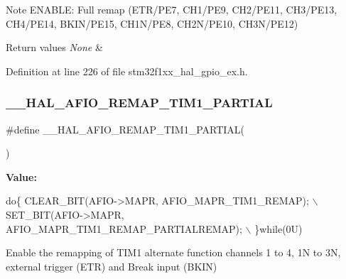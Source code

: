 \begin{DoxyNote}{Note}
E\+N\+A\+B\+LE\+: Full remap (E\+T\+R/\+P\+E7, C\+H1/\+P\+E9, C\+H2/\+P\+E11, C\+H3/\+P\+E13, C\+H4/\+P\+E14, B\+K\+I\+N/\+P\+E15, C\+H1\+N/\+P\+E8, C\+H2\+N/\+P\+E10, C\+H3\+N/\+P\+E12) 
\end{DoxyNote}

\begin{DoxyRetVals}{Return values}
{\em None} & \\
\hline
\end{DoxyRetVals}


Definition at line 226 of file stm32f1xx\+\_\+hal\+\_\+gpio\+\_\+ex.\+h.

\mbox{\label{group___g_p_i_o_ex___a_f_i_o___a_f___r_e_m_a_p_p_i_n_g_ga4e4fec9496a03c10c94f0f4e8d940b08}} 
\subsubsection{\texorpdfstring{\+\_\+\+\_\+\+H\+A\+L\+\_\+\+A\+F\+I\+O\+\_\+\+R\+E\+M\+A\+P\+\_\+\+T\+I\+M1\+\_\+\+P\+A\+R\+T\+I\+AL}{\_\_HAL\_AFIO\_REMAP\_TIM1\_PARTIAL}}
{\footnotesize\ttfamily \#define \+\_\+\+\_\+\+H\+A\+L\+\_\+\+A\+F\+I\+O\+\_\+\+R\+E\+M\+A\+P\+\_\+\+T\+I\+M1\+\_\+\+P\+A\+R\+T\+I\+AL(\begin{DoxyParamCaption}{ }\end{DoxyParamCaption})}

{\bfseries Value\+:}
\begin{DoxyCode}
\textcolor{keywordflow}{do}\{ CLEAR\_BIT(AFIO->MAPR, AFIO\_MAPR\_TIM1\_REMAP);            \(\backslash\)
                                             SET\_BIT(AFIO->MAPR, AFIO\_MAPR\_TIM1\_REMAP\_PARTIALREMAP); \(\backslash\)
                                           \}\textcolor{keywordflow}{while}(0U)
\end{DoxyCode}


Enable the remapping of T\+I\+M1 alternate function channels 1 to 4, 1N to 3N, external trigger (E\+TR) and Break input (B\+K\+IN) 


